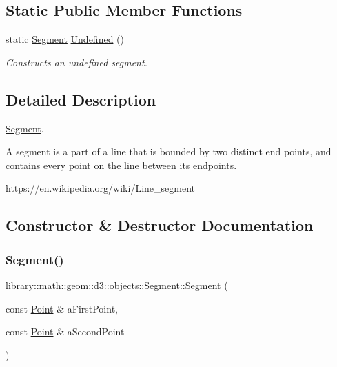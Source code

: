 \subsection*{Static Public Member Functions}
\begin{DoxyCompactItemize}
\item 
static \hyperlink{classlibrary_1_1math_1_1geom_1_1d3_1_1objects_1_1_segment}{Segment} \hyperlink{classlibrary_1_1math_1_1geom_1_1d3_1_1objects_1_1_segment_a3b2505e9553ba0067f8184120c106602}{Undefined} ()
\begin{DoxyCompactList}\small\item\em Constructs an undefined segment. \end{DoxyCompactList}\end{DoxyCompactItemize}


\subsection{Detailed Description}
\hyperlink{classlibrary_1_1math_1_1geom_1_1d3_1_1objects_1_1_segment}{Segment}. 

A segment is a part of a line that is bounded by two distinct end points, and contains every point on the line between its endpoints.

https\+://en.wikipedia.\+org/wiki/\+Line\+\_\+segment 

\subsection{Constructor \& Destructor Documentation}
\mbox{\label{classlibrary_1_1math_1_1geom_1_1d3_1_1objects_1_1_segment_a5562342d1edf2f52e37ce1bc138ee7d7}} 
\subsubsection{\texorpdfstring{Segment()}{Segment()}}
{\footnotesize\ttfamily library\+::math\+::geom\+::d3\+::objects\+::\+Segment\+::\+Segment (\begin{DoxyParamCaption}\item[{const \hyperlink{classlibrary_1_1math_1_1geom_1_1d3_1_1objects_1_1_point}{Point} \&}]{a\+First\+Point,  }\item[{const \hyperlink{classlibrary_1_1math_1_1geom_1_1d3_1_1objects_1_1_point}{Point} \&}]{a\+Second\+Point }\end{DoxyParamCaption})}



